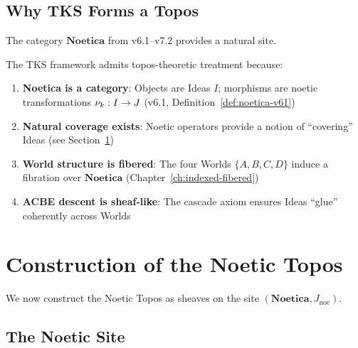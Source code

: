 \subsection{Why TKS Forms a Topos}
\label{subsec:why-tks-topos}

The category $\mathbf{Noetica}$ from v6.1--v7.2 provides a natural site.

\begin{proposition}
\label{prop:tks-admits-topos}
The TKS framework admits topos-theoretic treatment because:
\begin{enumerate}[label=(\alph*)]
  \item \textbf{Noetica is a category}: Objects are Ideas $I$; morphisms are
        noetic transformations $\nu_{k} : I \to J$ (v6.1, Definition~\ref{def:noetica-v61})
  \item \textbf{Natural coverage exists}: Noetic operators provide a notion of
        ``covering'' Ideas (see Section~\ref{sec:noetic-topos-construction})
  \item \textbf{World structure is fibered}: The four Worlds $\{A, B, C, D\}$
        induce a fibration over $\mathbf{Noetica}$ (Chapter~\ref{ch:indexed-fibered})
  \item \textbf{ACBE descent is sheaf-like}: The cascade axiom ensures Ideas
        ``glue'' coherently across Worlds
\end{enumerate}
\end{proposition}

\section{Construction of the Noetic Topos}
\label{sec:noetic-topos-construction}

We now construct the Noetic Topos as sheaves on the site $(\mathbf{Noetica}, J_{\mathrm{noe}})$.

\subsection{The Noetic Site}
\label{subsec:noetic-site}

